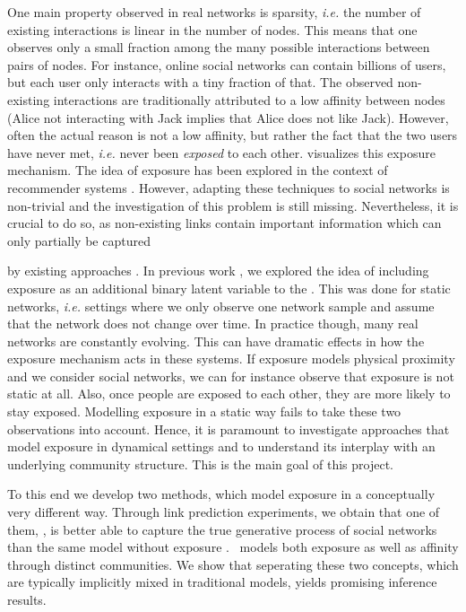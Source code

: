 One main property observed in real networks is sparsity, \textit{i.e.} the number of existing interactions is linear in the number of nodes. 
This means that one observes only a small fraction among the many possible interactions between pairs of nodes.
For instance, online social networks can contain billions of users, but each user only interacts
with a tiny fraction of that. The observed non-existing interactions are traditionally attributed to a low affinity between nodes
(Alice not interacting with Jack implies that Alice does not like Jack).
However, often the actual reason is not a low affinity, but rather the fact that the two users have never met, 
\textit{i.e.} never been \textit{exposed} to each other.  visualizes this exposure mechanism. 
The idea of exposure has been explored in the context of recommender systems \cite{liang2016modeling,chuklin2015click,wang2016learning,yang2018unbiased}. 
However, adapting these techniques to social networks is non-trivial and the investigation of this problem is still missing. 
Nevertheless, it is crucial to do so, as non-existing links contain important information which can only partially be captured 

by existing approaches \cite{ball2011efficient,de2017community,schein2016bayesian,zhao2012consistency}.
In previous work \cite{static_exp}, we explored the idea of including exposure as an additional binary latent variable to the \sbm.
This was done for static networks, \textit{i.e.} settings where we only observe one network sample and assume that the network does not change over time. 
In practice though, many real networks are constantly evolving. 
This can have dramatic effects in how the exposure mechanism acts in these systems. 
If exposure models physical proximity and we consider social networks, we can for instance observe that exposure is not static at all. 
Also, once people are exposed to each other, they are more likely to stay exposed.
Modelling exposure in a static way fails to take these two observations into account.
Hence, it is paramount to investigate approaches that model exposure in dynamical settings and to understand its interplay with an underlying community structure. 
This is the main goal of this project.

To this end we develop two methods, which model exposure in a conceptually very different way. 
Through link prediction experiments, we obtain that one of them, \expm, 
is better able to capture the true generative process of social networks than the same model without exposure \cite{de2017community}.
\expm\ models both exposure as well as affinity through distinct communities.
We show that seperating these two concepts, which are typically implicitly mixed in traditional models, yields promising inference results.

